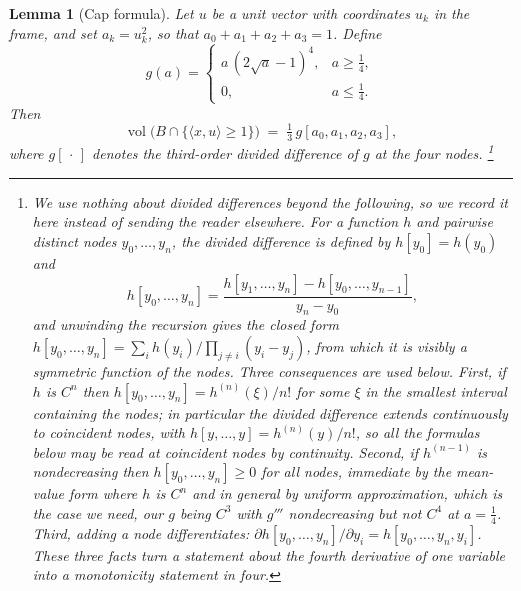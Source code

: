 \documentclass[11pt,reqno]{amsart}
\renewcommand{\_}{\origunderscore\allowbreak}
\numberwithin{equation}{section}
\theoremstyle{plain}
\newtheorem{lem}[thm]{Lemma}
\theoremstyle{definition}
\theoremstyle{remark}
\DeclareMathOperator{\vol}{vol}
\begin{document}
\begin{lem}[Cap formula]\label{lem:cap-formula}
Let $u$ be a unit vector with coordinates $u_k$ in the frame, and set
$a_k=u_k^2$, so that $a_0+a_1+a_2+a_3=1$. Define
\[
  g(a)=\begin{cases} a\,(2\sqrt a-1)^4, & a\ge\tfrac14,\\[2pt] 0,& a\le\tfrac14 .\end{cases}
\]
Then
\[
  \vol\bigl(B\cap\{\langle x,u\rangle\ge1\}\bigr)
  \;=\;\tfrac13\,g[a_0,a_1,a_2,a_3],
\]
where $g[\,\cdot\,]$ denotes the third-order divided difference of $g$ at
the four nodes.%
\footnote{We use nothing about divided differences beyond the following,
  so we record it here instead of sending the reader elsewhere. For a
  function $h$ and pairwise distinct nodes $y_0,\dots,y_n$, the divided
  difference is defined by $h[y_0]=h(y_0)$ and
  \[
    h[y_0,\dots,y_n]
    =\frac{h[y_1,\dots,y_n]-h[y_0,\dots,y_{n-1}]}{y_n-y_0},
  \]
  and unwinding the recursion gives the closed form
  $h[y_0,\dots,y_n]=\sum_{i}h(y_i)\big/\prod_{j\ne i}(y_i-y_j)$, from
  which it is visibly a symmetric function of the nodes. Three
  consequences are used below. First, if $h$ is $C^n$ then
  $h[y_0,\dots,y_n]=h^{(n)}(\xi)/n!$ for some $\xi$ in the smallest
  interval containing the nodes; in particular the divided difference
  extends continuously to coincident nodes, with
  $h[y,\dots,y]=h^{(n)}(y)/n!$, so all the formulas below may be read at
  coincident nodes by continuity. Second, if $h^{(n-1)}$ is
  nondecreasing then $h[y_0,\dots,y_n]\ge0$ for all nodes, immediate by
  the mean-value form where $h$ is $C^n$ and in general by uniform
  approximation, which is the case we need, our $g$ being $C^3$ with
  $g'''$ nondecreasing but not $C^4$ at $a=\tfrac14$. Third, adding a
  node differentiates:
  $\partial h[y_0,\dots,y_n]/\partial y_i=h[y_0,\dots,y_n,y_i]$. These
  three facts turn a statement about the fourth derivative of one
  variable into a monotonicity statement in four.}
\end{lem}
\end{document}
